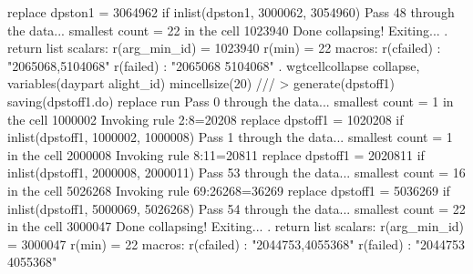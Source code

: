   replace dpston1 = 3064962 if inlist(dpston1, 3000062, 3054960)
Pass 48 through the data...
  smallest count = 22 in the cell      1023940
  Done collapsing! Exiting...
{\smallskip}
. return list
{\smallskip}
scalars:
         r(arg_min_id) =  1023940
                r(min) =  22
{\smallskip}
macros:
            r(cfailed) : "2065068,5104068"
             r(failed) : "2065068 5104068"
{\smallskip}
. wgtcellcollapse collapse, variables(daypart alight_id) mincellsize(20) ///
>         generate(dpstoff1) saving(dpstoff1.do) replace run
Pass 0 through the data...
  smallest count = 1 in the cell      1000002
  Invoking rule 2:8=20208
  replace dpstoff1 = 1020208 if inlist(dpstoff1, 1000002, 1000008)
Pass 1 through the data...
  smallest count = 1 in the cell      2000008
  Invoking rule 8:11=20811
  replace dpstoff1 = 2020811 if inlist(dpstoff1, 2000008, 2000011)
\smallskip
\oom
\smallskip
Pass 53 through the data...
  smallest count = 16 in the cell      5026268
  Invoking rule 69:26268=36269
  replace dpstoff1 = 5036269 if inlist(dpstoff1, 5000069, 5026268)
Pass 54 through the data...
  smallest count = 22 in the cell      3000047
  Done collapsing! Exiting...
{\smallskip}
. return list
{\smallskip}
scalars:
         r(arg_min_id) =  3000047
                r(min) =  22
{\smallskip}
macros:
            r(cfailed) : "2044753,4055368"
             r(failed) : "2044753 4055368"
